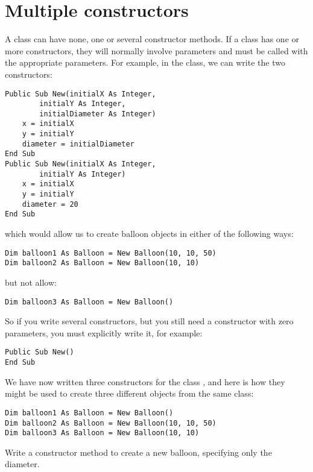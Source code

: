 	\section{Multiple constructors}
		A class can have none, one or several constructor methods. If a class has one or more constructors, they will normally involve parameters and must be called with the appropriate parameters. For example, in the  class, we can write the two constructors:
		\begin{lstlisting}
Public Sub New(initialX As Integer,
		initialY As Integer,
		initialDiameter As Integer)
	x = initialX
	y = initialY
	diameter = initialDiameter
End Sub
Public Sub New(initialX As Integer,
		initialY As Integer)
	x = initialX
	y = initialY
	diameter = 20
End Sub
		\end{lstlisting}
		which would allow us to create balloon objects in either of the following ways:
		\begin{lstlisting}
Dim balloon1 As Balloon = New Balloon(10, 10, 50)
Dim balloon2 As Balloon = New Balloon(10, 10)
		\end{lstlisting}
		but not allow:
		\begin{lstlisting}
Dim balloon3 As Balloon = New Balloon()
		\end{lstlisting}
		So if you write several constructors, but you still need a constructor with zero parameters, you must explicitly write it, for example:
		\begin{lstlisting}
Public Sub New()
End Sub
		\end{lstlisting}
		We have now written three constructors for the class , and here is how they might be used to create three different objects from the same class:
		\begin{lstlisting}
Dim balloon1 As Balloon = New Balloon()
Dim balloon2 As Balloon = New Balloon(10, 10, 50)
Dim balloon3 As Balloon = New Balloon(10, 10)
		\end{lstlisting}

		\begin{stqb}
			\begin{STQ}
				\item Write a constructor method to create a new balloon, specifying only the diameter.
			\end{STQ}
		\end{stqb}



